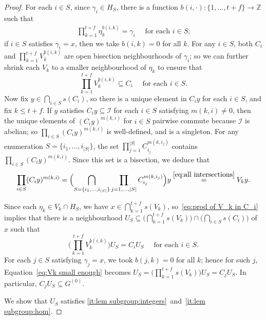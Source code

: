 \documentclass[a4paper, 12pt]{amsart}
\theoremstyle{plain}
\theoremstyle{definition}
\theoremstyle{remark}
\newcommand{\Ii}{\mathcal{I}}
\numberwithin{equation}{section}
\begin{document}
\begin{proof}
For each $i \in S$, since $\gamma_i \in H_S$, there is a function $b(i, \cdot)
: \{1, \dots, t+f\} \to \mathbb{Z}$ such that \begin{align}\label{eq:gamma_i in terms of eta_k}
\prod^{t+f}_{k=1}
\eta_k^{b(i,k)}
=
\gamma_i \quad\text{ for each $i \in S$;}
\end{align}
if $i \in S$ satisfies $\gamma_i = x$, then we take $b(i,k) = 0$ for all $k$. For any $i \in S$,
both $C_i$ and $\prod^{t+f}_{k=1} V_k^{b(i,k)}$ are open
bisection neighbourhoods of $\gamma_i$; so we can further shrink each $V_k$
to a smaller neighbourhood of $\eta_k$ to ensure that
\begin{equation}\label{eq:prod of V_k in C_i}
    \prod^{t+f}_{k=1} V_k^{b(i,k)} \subseteq C_i\quad\text{ for each $i \in S$.}
\end{equation}
Now fix $y\in \bigcap_{i\in S}s(C_i)$, so there is a unique element in $C_i y$ for each $i\in S$, and fix $k\leq t+f$. If $y$ satisfies $C_i y \subseteq \Ii$ for each $i \in S$ satisfying $m(k,i) \not= 0$, then
the unique elements of
$(C_i y)^{m(k,i)}$ for $i\in S$ pairwise commute because $\Ii$ is abelian; so $\prod_{i\in S}(C_i y)^{m(k,i)}$ is well-defined, and is a singleton. For any enumeration $S=\{i_{1},\ldots,i_{|S|}\}$, the set $\prod_{j=1}^{|S|} C_{i_j}^{m(k,i_j)}$ contains $\prod_{i\in S}(C_i y)^{m(k,i)}$. Since this set is a bisection, we deduce that
\begin{equation}\label{eq:BiI is V}
    \prod_{i\in S}(C_i y)^{m(k,i)}
    =
    \Bigl(\bigcap_{S=\{i_1,\ldots,i_{|S|}\}}\prod_{j=1,\ldots,|S|} C_{i_j}^{m(k,i_j)}\Bigr)y
    \overset{\eqref{eq:all intersections}}{=} V_{k}y.
\end{equation}

Since each $\eta_k \in V_k \cap H_S$, we have $x \in \bigcap^{t+f}_{k=1}
s(V_k)$, so~\eqref{eq:prod of V_k in C_i} implies that there is a neighbourhood $U_S \subseteq \big(\bigcap^{t+f}_{k=1}
s(V_k)\big) \cap \big(\bigcap_{i \in S} s(C_i)\big)$ of $x$ such that
\begin{equation}\label{eq:Vk small enough}
\Big(\prod^{t+f}_{k=1} V_k^{b(i,k)}\Big) U_S = C_i U_S\quad\text{ for each $i \in S$.}
\end{equation}
For each $j \in S$ satisfying $\gamma_j = x$, we took $b(j,k) = 0$ for all $k$; hence for such $j$, Equation~\eqref{eq:Vk small enough} becomes
$U_S = \Big(\prod^{t+f}_{k=1} s(V_k)\Big) U_S =  C_j U_S$. In particular, $C_j U_S \subseteq G^{(0)}$.

We show that $U_S$ satisfies \ref{it:lem subgroup:integers}~and~\ref{it:lem subgroup:hom}.


\end{proof}
\end{document}
